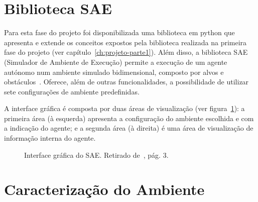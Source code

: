 \section{Biblioteca SAE}\label{sec:biblioteca-sae}

Para esta fase do projeto foi disponibilizada uma biblioteca em python que apresenta e extende os conceitos expostos pela biblioteca realizada na primeira fase do projeto (ver capítulo~\ref{ch:projeto-parte1}).
Além disso, a biblioteca SAE (Simulador de Ambiente de Execução) permite a execução de um agente autónomo num ambiente simulado bidimensional, composto por alvos e obstáculos~\cite{isel:iasa:slides:sae-documentacao}.
Oferece, além de outras funcionalidades, a possibilidade de utilizar sete configurações de ambiente predefinidas.

A interface gráfica é composta por duas áreas de visualização (ver figura~\ref{fig:sae-interface-grafica}): a primeira área (à esquerda) apresenta a configuração do ambiente escolhida e com a indicação do agente; e a segunda área (à direita) é uma área de visualização de informação interna do agente.

\begin{figure}[H]
    \begin{center}
    \end{center}
    \caption{Interface gráfica do SAE.
    Retirado de~\cite{isel:iasa:slides:sae-documentacao}, pág.
    3.}\label{fig:sae-interface-grafica}
\end{figure}

\section{Caracterização do Ambiente}\label{sec:caracterizacao-ambiente}

